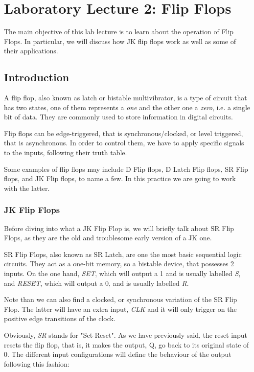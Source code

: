 \section{Laboratory Lecture 2: Flip Flops}
\label{sec:FLIP_FLOPS}

The main objective of this lab lecture is to learn about the operation of Flip Flops. In particular, we will discuss how JK flip flops work as well as some of their applications.

\subsection{Introduction}

A flip flop, also known as latch or bistable multivibrator, is a type of circuit that has two states, one of them represents a \textit{one} and the other one a \textit{zero}, i.e. a single bit of data. They are commonly used to store information in digital circuits.\medskip 

Flip flops can be edge-triggered, that is synchronous/clocked, or level triggered, that is asynchronous. In order to control them, we have to apply specific signals to the inputs, following their truth table.\medskip

Some examples of flip flops may include D Flip flops, D Latch Flip flops, SR Flip flops, and JK Flip flops, to name a few. In this practice we are going to work with the latter.

\subsubsection{JK Flip Flops}

Before diving into what a JK Flip Flop is, we will briefly talk about SR Flip Flops, as they are the old and troublesome early version of a JK one.\medskip

SR Flip Flops, also known as SR Latch, are one the most basic sequential logic circuits. They act as a one-bit memory, so a bistable device, that possesses 2 inputs. On the one hand, \textit{SET}, which will output a 1 and is usually labelled \textit{S}, and \textit{RESET}, which will output a 0, and is usually labelled \textit{R}. \medskip

Note than we can also find a clocked, or synchronous variation of the SR Flip Flop. The latter will have an extra input, \textit{CLK} and it will only trigger on the positive edge transitions of the clock.\medskip

Obviously, \textit{SR} stands for "Set-Reset". As we have previously said, the reset input resets the flip flop, that is, it makes the output, Q, go back to its original state of 0. The different input configurations will define the behaviour of the output following this fashion:\medskip


